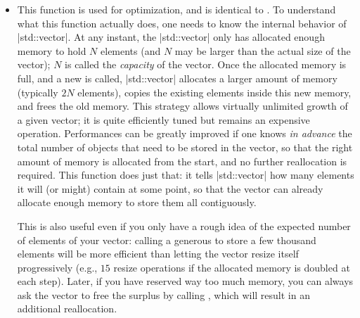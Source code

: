 \documentclass[12pt,a4paper]{report}
\newcommand{\stdvec}{\cppinline|std::vector|\xspace}
\newenvironment{example}
{
    \begin{mdframed}[style=example,frametitle={Example}]
}
{
    \end{mdframed}
}
\begin{document}
\begin{itemize}
The behavior of this function is different for monodimensional and multidimensional vectors. For monodimensional vectors, this function appends a new element at the end of the vector, and therefore takes for argument a single value of type  (or convertible to ). For multidimensional vectors, this function takes for argument another vector of  dimensions, and whose lengths match the \emph{last}  dimensions of the first vector. This new vector is inserted after the existing elements, and the first dimension of the first vector is increased by one.

\begin{example}
\begin{cppcode}
vec1i v = {1,2,3};
v.push_back(4); // {1,2,3,4}

vec2i w = {{1,2,3}, {4,5,6}}; // dims: {2,3}
w.push_back({7,8,9}); // {{1,2,3}, {4,5,6}, {7,8,9}}  dims: {3,3}
w.push_back({7,8});   // error: dimensions do not match
\end{cppcode}
\end{example}

\item {}

This function is used for optimization, and is identical to . To understand what this function actually does, one needs to know the internal behavior of \stdvec. At any instant, the \stdvec only has allocated enough memory to hold $N$ elements (and $N$ may be larger than the actual size of the vector); $N$ is called the \emph{capacity} of the vector. Once the allocated memory is full, and a new  is called, \stdvec allocates a larger amount of memory (typically $2N$ elements), copies the existing elements inside this new memory, and frees the old memory. This strategy allows virtually unlimited growth of a given vector; it is quite efficiently tuned but remains an expensive operation. Performances can be greatly improved if one knows \emph{in advance} the total number of objects that need to be stored in the vector, so that the right amount of memory is allocated from the start, and no further reallocation is required. This function does just that: it tells \stdvec how many elements it will (or might) contain at some point, so that the vector can already allocate enough memory to store them all contiguously.

This is also useful even if you only have a rough idea of the expected number of elements of your vector: calling a generous  to store a few thousand elements will be more efficient than letting the vector resize itself progressively (e.g., $15$ resize operations if the allocated memory is doubled at each step). Later, if you have reserved way too much memory, you can always ask the vector to free the surplus by calling , which will result in an additional reallocation.


\end{itemize}
\end{document}
